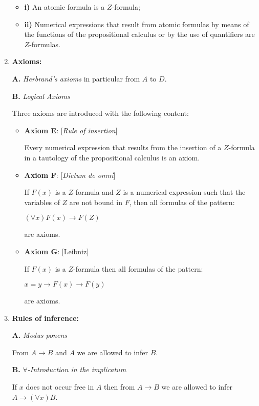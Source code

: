 \documentclass[12pt]{article}
\begin{document}
\begin{enumerate}
\begin{itemize}
\item \textbf{i)} An atomic formula is a $Z$-formula;

\item \textbf{ii)} Numerical expressions that result from atomic formulas by means of the functions of the propositional calculus or by the use of quantifiers are $Z$-formulas.
\end{itemize}

\item \textbf{Axioms:}

\textbf{A.} \emph{Herbrand's axioms} in particular from $A$ to $D$.

\textbf{B.} \emph{Logical Axioms}

Three axioms are introduced with the following content:

\begin{itemize}
\item \textbf{Axiom E}: [\emph{Rule of insertion}]

Every numerical expression that results from the insertion of a $Z$-formula in a tautology of the propositional calculus is an axiom.

\item \textbf{Axiom F}: [\emph{Dictum de omni}]

If $F(x)$ is a $Z$-formula and $Z$ is a numerical expression such that the variables of $Z$ are not bound in $F$, then all formulas of the pattern:

\begin{center}
$(\forall x) F (x) \rightarrow F(Z)$ 
\end{center}

are axioms.

\item \textbf{Axiom G}: [Leibniz]

If $F (x)$ is a $Z$-formula then all formulas of the pattern:

\begin{center}
$x = y \rightarrow F (x) \rightarrow F (y)$ 
\end{center}

are axioms.
\end{itemize}

\item \textbf{Rules of inference:}

\textbf{A.} \emph{Modus ponens}

From $A \rightarrow B$ and $A$ we are allowed to infer $B$.

\textbf{B.} \emph{$\forall$-Introduction in the implicatum}

If $x$ does not occur free in $A$ then from $A \rightarrow B$ we are allowed to infer $A \rightarrow (\forall x) B$.

\end{enumerate}
\end{document}
